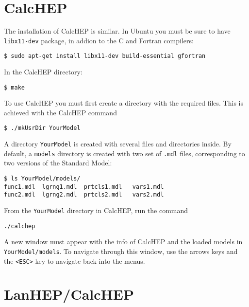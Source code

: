 \section{CalcHEP}
\begin{frame}{}
The installation of CalcHEP is similar. In Ubuntu you must be sure to have \lstinline{libx11-dev} package, in addion to the C and Fortran compilers:
\begin{lstlisting}
$ sudo apt-get install libx11-dev build-essential gfortran
\end{lstlisting}
In the CalcHEP directory:
\begin{lstlisting}
$ make
\end{lstlisting}

To use CalcHEP you must first create a directory with the required files. This is achieved with the CalcHEP command
\begin{lstlisting}
$ ./mkUsrDir YourModel
\end{lstlisting}
A directory \lstinline{YourModel} is created with several files and directories inside. By default, a \lstinline{models} directory is created with two set of \lstinline{.mdl} files, corresponding to two versions of the Standard Model:
\begin{lstlisting}
$ ls YourModel/models/
func1.mdl  lgrng1.mdl  prtcls1.mdl   vars1.mdl  
func2.mdl  lgrng2.mdl  prtcls2.mdl   vars2.mdl
\end{lstlisting}

From the \lstinline{YourModel} directory in CalcHEP, run the command
\begin{lstlisting}
./calchep
\end{lstlisting}
A new window must appear with the info of CalcHEP and the loaded models in \lstinline{YourModel/models}. To navigate through this window, use the arrows keys and the \lstinline{<ESC>} key to navigate back into the menus.  
\end{frame}

\section{LanHEP/CalcHEP}


